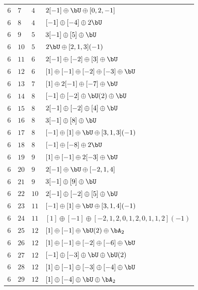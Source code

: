 \begin{center}
\begin{longtable}{llll}
 \(6\) & \(7\) & \(4\) & \(2 [-1] \oplus \bU \oplus [0, 2, -1]\) \\
 \(6\) & \(8\) & \(4\) & \([-1] \oplus [-4] \oplus 2 \bU\) \\
 \(6\) & \(9\) & \(5\) & \(3 [-1] \oplus [5] \oplus \bU\) \\
 \(6\) & \(10\) & \(5\) & \(2 \bU \oplus [2, 1, 3](-1)\) \\
 \(6\) & \(11\) & \(6\) & \(2 [-1] \oplus [-2] \oplus [3] \oplus \bU\) \\
 \(6\) & \(12\) & \(6\) & \([1] \oplus [-1] \oplus [-2] \oplus [-3] \oplus \bU\) \\
 \(6\) & \(13\) & \(7\) & \([1] \oplus 2[-1] \oplus [-7] \oplus \bU\) \\
 \(6\) & \(14\) & \(8\) & \([-1] \oplus [-2] \oplus \bU(2) \oplus \bU\) \\
 \(6\) & \(15\) & \(8\) & \(2 [-1] \oplus [-2] \oplus [4] \oplus \bU\) \\
 \(6\) & \(16\) & \(8\) & \(3 [-1] \oplus [8] \oplus \bU\) \\
 \(6\) & \(17\) & \(8\) & \([-1] \oplus [1] \oplus \bU \oplus [3, 1, 3](-1)\) \\
 \(6\) & \(18\) & \(8\) & \([-1] \oplus [-8] \oplus 2 \bU\) \\
 \(6\) & \(19\) & \(9\) & \([1] \oplus [-1] \oplus 2 [-3] \oplus \bU\) \\
 \(6\) & \(20\) & \(9\) & \(2 [-1] \oplus \bU \oplus [-2, 1, 4]\) \\
 \(6\) & \(21\) & \(9\) & \(3 [-1] \oplus [9] \oplus \bU\) \\
 \(6\) & \(22\) & \(10\) & \(2 [-1] \oplus [-2] \oplus [5] \oplus \bU\) \\
 \(6\) & \(23\) & \(11\) & \([-1] \oplus [1] \oplus \bU \oplus [3, 1, 4](-1)\) \\
 \(6\) & \(24\) & \(11\) & \([1] \oplus [-1] \oplus [-2, 1, 2, 0, 1, 2, 0, 1, 1, 2](-1)\) \\
 \(6\) & \(25\) & \(12\) & \([1] \oplus [-1] \oplus \bU(2) \oplus \bA_{2}\) \\
 \(6\) & \(26\) & \(12\) & \([1] \oplus [-1] \oplus [-2] \oplus [-6] \oplus \bU\) \\
 \(6\) & \(27\) & \(12\) & \([-1] \oplus [-3] \oplus \bU \oplus \bU(2)\) \\
 \(6\) & \(28\) & \(12\) & \([1] \oplus [-1] \oplus [-3] \oplus [-4] \oplus \bU\) \\
 \(6\) & \(29\) & \(12\) & \([1] \oplus [-4] \oplus \bU \oplus \bA_{2}\) \\

\end{longtable}
\end{center}
